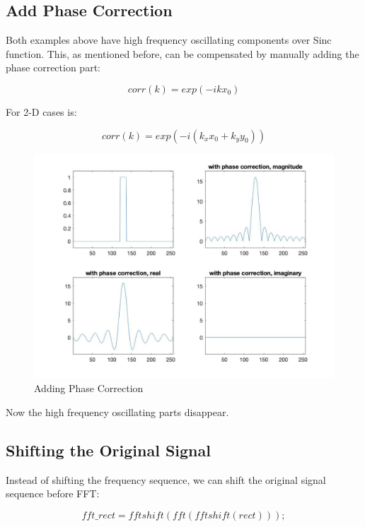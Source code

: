 \documentclass[11pt,a4paper,BCOR12mm, headexclude, footexclude, twoside, openright]{scrartcl}
\numberwithin{equation}{section} %
\numberwithin{figure}{section} %
\numberwithin{table}{section} %
\begin{document}
\newpage

\subsection{Add Phase Correction}

Both examples above have high frequency oscillating components over Sinc function. This, as mentioned before, can be compensated by manually adding the phase correction part:

\begin{equation}
    corr(k) = exp(-i k x_0) 
\end{equation}

For 2-D cases is:

\begin{equation}
    corr(k) = exp(-i (k_x x_0 + k_y y_0)) 
\end{equation}

\begin{figure}[h!]
\centering
\includegraphics[scale=0.35]{2-3.jpg}
\caption{Adding Phase Correction}
\end{figure}

Now the high frequency oscillating parts disappear.
\newpage
\subsection{Shifting the Original Signal}

Instead of shifting the frequency sequence, we can shift the original signal sequence before FFT:

\begin{equation}
    fft \_ rect=fftshift(fft(fftshift(rect)));
\end{equation}
\end{document}
